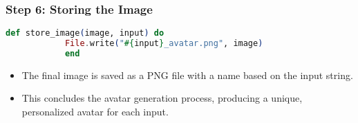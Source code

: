 \documentclass[aspectratio=169, table]{beamer}
\begin{document}
	\begin{frame}[fragile]
		\frametitle{Step 6: Storing the Image}
		\begin{lstlisting}[language=Elixir]
			def store_image(image, input) do
			File.write("#{input}_avatar.png", image)
			end
		\end{lstlisting}
		\begin{itemize}
			\item The final image is saved as a PNG file with a name based on the input string.
			\item This concludes the avatar generation process, producing a unique, personalized avatar for each input.
		\end{itemize}
	\end{frame}
	
\end{document}
